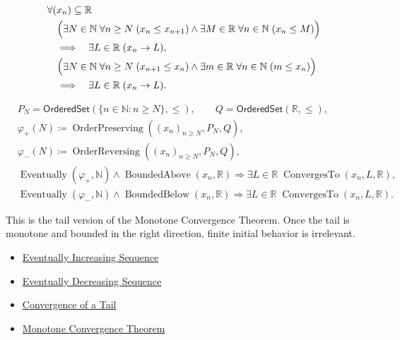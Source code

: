 \begin{remark*}
\[
\begin{aligned}
&\forall (x_n)\subseteq\mathbb{R}\\
&\quad\Bigl(
  \exists N\in\mathbb{N}\;\forall n\ge N\;(x_n\le x_{n+1})
  \land
  \exists M\in\mathbb{R}\;\forall n\in\mathbb{N}\;(x_n\le M)
\Bigr)\\
&\quad\Longrightarrow\quad
\exists L\in\mathbb{R}\;(x_n\to L),\\
&\quad\Bigl(
  \exists N\in\mathbb{N}\;\forall n\ge N\;(x_{n+1}\le x_n)
  \land
  \exists m\in\mathbb{R}\;\forall n\in\mathbb{N}\;(m\le x_n)
\Bigr)\\
&\quad\Longrightarrow\quad
\exists L\in\mathbb{R}\;(x_n\to L).
\end{aligned}
\]
\end{remark*}

\begin{remark*}
\[
\begin{aligned}
&P_N=\mathsf{OrderedSet}(\{n\in\mathbb{N}:n\ge N\},\leq),\qquad
Q=\mathsf{OrderedSet}(\mathbb{R},\leq),\\
&\varphi_{+}(N)\coloneqq
\operatorname{OrderPreserving}((x_n)_{n\ge N},P_N,Q),\\
&\varphi_{-}(N)\coloneqq
\operatorname{OrderReversing}((x_n)_{n\ge N},P_N,Q),\\
&\operatorname{Eventually}(\varphi_{+},\mathbb{N})
\land
\operatorname{BoundedAbove}(x_n,\mathbb{R})
\Longrightarrow
\exists L\in\mathbb{R}\;\operatorname{ConvergesTo}(x_n,L,\mathbb{R}),\\
&\operatorname{Eventually}(\varphi_{-},\mathbb{N})
\land
\operatorname{BoundedBelow}(x_n,\mathbb{R})
\Longrightarrow
\exists L\in\mathbb{R}\;\operatorname{ConvergesTo}(x_n,L,\mathbb{R}).
\end{aligned}
\]
\end{remark*}

\begin{remark*}[Interpretation]
This is the tail version of the Monotone Convergence Theorem. Once the tail is
monotone and bounded in the right direction, finite initial behavior is
irrelevant.
\end{remark*}

\begin{dependencies}
\begin{itemize}
  \item \hyperref[def:eventually-increasing-sequence]{Eventually Increasing Sequence}
  \item \hyperref[def:eventually-decreasing-sequence]{Eventually Decreasing Sequence}
  \item \hyperref[thm:convergence-of-tail]{Convergence of a Tail}
  \item \hyperref[thm:monotone-convergence-theorem]{Monotone Convergence Theorem}
\end{itemize}
\end{dependencies}

